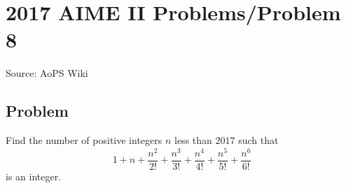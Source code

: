 \documentclass[12pt]{article}
\begin{document}
\section*{{2017 AIME II Problems/Problem 8}}
Source: AoPS Wiki

\subsection*{Problem}
Find the number of positive integers $n$ less than $2017$ such that \[1+n+\frac{n^2}{2!}+\frac{n^3}{3!}+\frac{n^4}{4!}+\frac{n^5}{5!}+\frac{n^6}{6!}\] is an integer.
\end{document}
